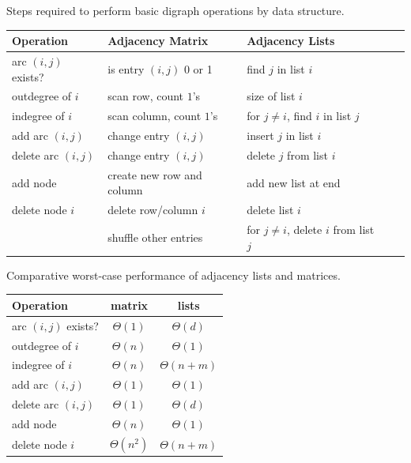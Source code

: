 \begin{samepage}
Steps required to perform basic digraph operations by data structure.
\begin{center}
\begin{tabular}{|l|l|l|l|l|}
\hline

\textbf{Operation} & \textbf{Adjacency Matrix} & \textbf{Adjacency Lists} \\
\hline

arc $(i, j)$ exists? & is entry $(i,j)$ 0 or 1  & find $j$ in  list $i$ \\
\hline
outdegree  of $i$ & scan row, count $1$'s & size of  list  $i$\\
\hline
indegree of $i$ & scan column,  count $1$'s & for $j\neq i$, find $i$ in list $j$ \\
\hline
add arc $(i, j)$ & change entry $(i ,j)$ & insert $j$ in list $i$ \\
\hline
delete arc $(i, j)$ & change entry $(i ,j)$ & delete $j$ from list $i$ \\
\hline
add node & create new row and column & add new list at end\\
\hline
delete node $i$ & delete row/column $i$  & delete list $i$ \\
& shuffle other entries & for $j\neq i$, delete  $i$ from list $j$ \\ 
\hline
\end{tabular}
\end{center}
\end{samepage}


\begin{center}
Comparative worst-case performance of adjacency lists and matrices.

\begin{tabular}{|l|c|c|}
\hline

\textbf{Operation} & \textbf{matrix} & \textbf{lists} \\
\hline

arc $(i, j)$ exists? & $\Theta(1)$  & $\Theta(d)$ \\
\hline
outdegree  of $i$ & $\Theta(n)$ & $\Theta(1)$ \\
\hline
indegree of $i$ & $\Theta(n)$ &  $\Theta(n+m)$ \\
\hline
add arc $(i, j)$ & $\Theta(1)$ & $\Theta(1)$  \\
\hline
delete arc $(i, j)$ & $\Theta(1)$  & $\Theta(d)$  \\
\hline
add node & $\Theta(n)$ & $\Theta(1)$  \\
\hline
delete node $i$ & $\Theta(n^2)$  & $\Theta(n+m)$  \\
\hline
\end{tabular}
\end{center}

